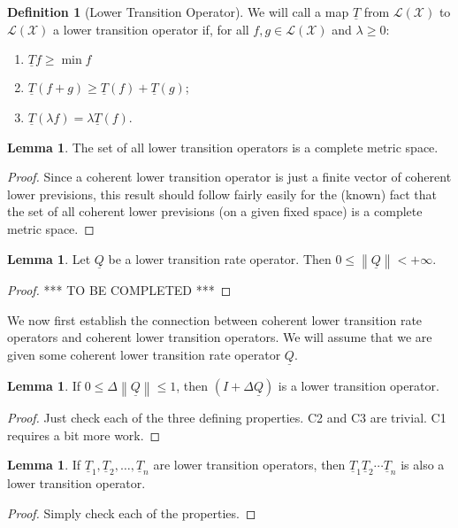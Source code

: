 \documentclass[10pt]{paper}
\theoremstyle{definition}
\newtheorem{lemma}[theorem]{Lemma}
\newtheorem{definition}{Definition}
\newcommand{\states}{\mathcal{X}}
\newcommand{\lt}{\underline{T}}
\newcommand{\gambles}{\mathcal{L}}
\newcommand{\gamblesX}{\gambles(\states)}
\newcommand{\lrate}{\underline{Q}}
\newcommand{\norm}[1]{\left\lVert #1 \right\rVert}
\begin{document}
\begin{definition}[Lower Transition Operator]\label{def:coh_low_trans}
We will call a map $\lt$ from $\gamblesX$ to $\gamblesX$ a lower transition operator if, for all $f,g\in\gamblesX$ and $\lambda\geq0$:

\vspace{5pt}
\begin{enumerate}[label=C\arabic*:]
\item
$\lt f\geq\min f$
\item
$\lt(f+g)\geq\lt(f)+\lt(g)$;
\item
$\lt(\lambda f)=\lambda\lt(f)$.
\end{enumerate}
\vspace{5pt}
\end{definition}

\begin{lemma}\label{lemma:completemetricspace}
The set of all lower transition operators is a complete metric space.
\end{lemma}
\begin{proof}
Since a coherent lower transition operator is just a finite vector of coherent lower previsions, this result should follow fairly easily for the (known) fact that the set of all coherent lower previsions (on a given fixed space) is a complete metric space.
\end{proof}

\begin{lemma}\label{lem:normlratefinite}
Let $\lrate$ be a lower transition rate operator. Then $0\leq\norm{\lrate}<+\infty$.
\end{lemma}
\begin{proof}
*** TO BE COMPLETED ***
\end{proof}

We now first establish the connection between coherent lower transition rate operators and coherent lower transition operators. We will assume that we are given some coherent lower transition rate operator $\lrate$.

\begin{lemma}\label{lemma:normQsmallenough}
If $0\leq\Delta\norm{\lrate}\leq1$, then $(I+\Delta\lrate)$ is a lower transition operator.
\end{lemma}
\begin{proof}
Just check each of the three defining properties. C2 and C3 are trivial. C1 requires a bit more work.
\end{proof}

\begin{lemma}\label{lemma:compositioncoherence}
If $\lt_1,\lt_2,\dots,\lt_n$ are lower transition operators, then  $\lt_1\lt_2\cdots\lt_n$ is also a lower transition operator.
\end{lemma}
\begin{proof}
Simply check each of the properties.
\end{proof}
\end{document}
